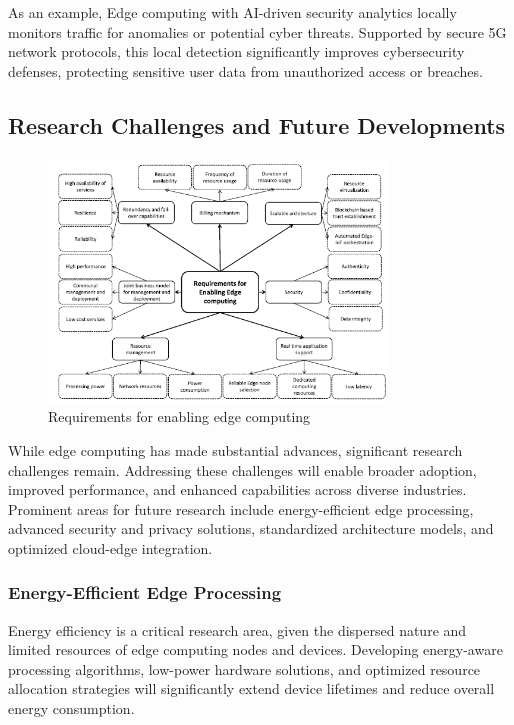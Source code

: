 \documentclass[runningheads]{llncs}
\begin{document}
\noindent As an example, Edge computing with AI-driven security analytics locally monitors traffic for anomalies or potential cyber threats. Supported by secure 5G network protocols, this local detection significantly improves cybersecurity defenses, protecting sensitive user data from unauthorized access or breaches.



\subsection{Research Challenges and Future Developments}

\begin{figure}[ht]
    \centering
    \includegraphics[width=0.8\textwidth]{IMG/2.png}
    \caption{Requirements for enabling edge computing}
    \label{fig:edge_requirements}
    \end{figure} 
\FloatBarrier

While edge computing has made substantial advances, significant research challenges remain. Addressing these challenges will enable broader adoption, improved performance, and enhanced capabilities across diverse industries. Prominent areas for future research include energy-efficient edge processing, advanced security and privacy solutions, standardized architecture models, and optimized cloud-edge integration.


\subsubsection{Energy-Efficient Edge Processing}
Energy efficiency is a critical research area, given the dispersed nature and limited resources of edge computing nodes and devices. Developing energy-aware processing algorithms, low-power hardware solutions, and optimized resource allocation strategies will significantly extend device lifetimes and reduce overall energy consumption.
\end{document}
